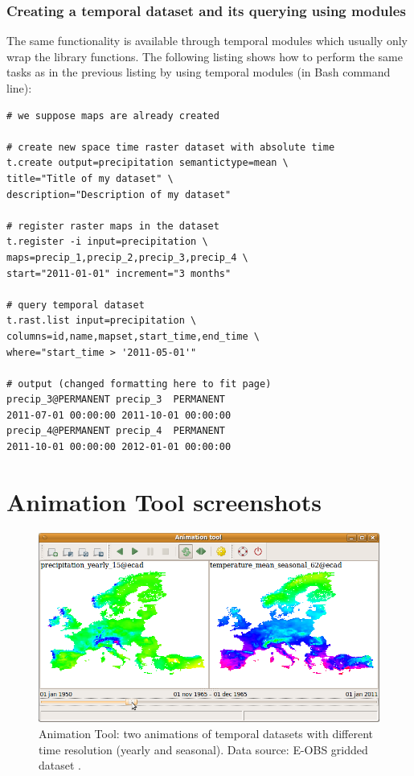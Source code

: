 \documentclass[a4paper,12pt,oneside]{book}
\newcommand{\at}{Animation Tool\xspace}
\begin{document}
\subsection*{Creating a temporal dataset and its querying using modules}
The same functionality is available through temporal modules
which usually only wrap the library functions.
The following listing shows how to perform the same tasks as in the previous
listing by using temporal modules (in Bash command line):
\begin{small}
\begin{lstlisting}[style=python]
# we suppose maps are already created

# create new space time raster dataset with absolute time
t.create output=precipitation semantictype=mean \
title="Title of my dataset" \
description="Description of my dataset"

# register raster maps in the dataset
t.register -i input=precipitation \
maps=precip_1,precip_2,precip_3,precip_4 \
start="2011-01-01" increment="3 months"

# query temporal dataset
t.rast.list input=precipitation \
columns=id,name,mapset,start_time,end_time \
where="start_time > '2011-05-01'"

# output (changed formatting here to fit page)
precip_3@PERMANENT precip_3  PERMANENT
2011-07-01 00:00:00 2011-10-01 00:00:00
precip_4@PERMANENT precip_4  PERMANENT
2011-10-01 00:00:00 2012-01-01 00:00:00

\end{lstlisting}
\end{small}

\chapter{\at screenshots}
\label{appdx:animation}
\begin{figure}[h!]
  \centering
  \includegraphics{./images/animation_tool1.png}
  \caption[\at: two animations of temporal datasets with different time resolution (yearly and seasonal)]
  {\at: two animations of temporal datasets with different time resolution (yearly and seasonal).
  Data source: E-OBS gridded dataset \cite{haylock2008european}.}
  \label{fig:anim2D}
\end{figure}
\end{document}
